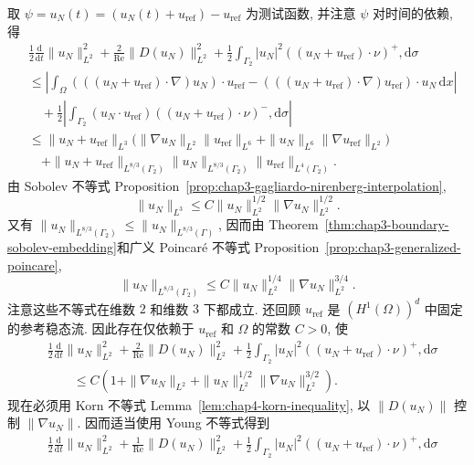 \begin{sloppypar}
\begin{Proof}
取 $\psi=u_N(t)=(u_N(t)+u_{\mathrm{ref}})-u_{\mathrm{ref}}$ 为测试函数, 并注意 $\psi$ 对时间的依赖, 得
\[
\begin{aligned}
 &\frac12\frac{\mathrm d}{\mathrm dt}\|u_N\|_{L^2}^2
 +\frac2{\operatorname{Re}}\|D(u_N)\|_{L^2}^2
 +\frac12\int_{\Gamma_2}|u_N|^2
 ((u_N+u_{\mathrm{ref}})\cdot\nu)^+,\mathrm d\sigma\\
 &\leq\left|\int_\Omega
 (((u_N+u_{\mathrm{ref}})\cdot\nabla)u_N)\cdot u_{\mathrm{ref}}
 -(((u_N+u_{\mathrm{ref}})\cdot\nabla)u_{\mathrm{ref}})\cdot u_N
 \,\mathrm dx\right|\\
 &\quad+\frac12\left|\int_{\Gamma_2}(u_N\cdot u_{\mathrm{ref}})
 ((u_N+u_{\mathrm{ref}})\cdot\nu)^-,\mathrm d\sigma\right|\\
 &\leq\|u_N+u_{\mathrm{ref}}\|_{L^3}
 \bigl(\|\nabla u_N\|_{L^2}\|u_{\mathrm{ref}}\|_{L^6}
 +\|u_N\|_{L^6}\|\nabla u_{\mathrm{ref}}\|_{L^2}\bigr)\\
 &\quad+\|u_N+u_{\mathrm{ref}}\|_{L^{8/3}(\Gamma_2)}
 \|u_N\|_{L^{8/3}(\Gamma_2)}
 \|u_{\mathrm{ref}}\|_{L^4(\Gamma_2)}.
\end{aligned}
\]
由 Sobolev 不等式 Proposition~\ref{prop:chap3-gagliardo-nirenberg-interpolation},
\[
 \|u_N\|_{L^3}\leq C\|u_N\|_{L^2}^{1/2}
 \|\nabla u_N\|_{L^2}^{1/2}.
\]
又有 $\|u_N\|_{L^{8/3}(\Gamma_2)}\leq\|u_N\|_{L^{8/3}(\Gamma)}$, 因而由 Theorem~\ref{thm:chap3-boundary-sobolev-embedding}和广义 Poincaré 不等式 Proposition~\ref{prop:chap3-generalized-poincare},
\[
 \|u_N\|_{L^{8/3}(\Gamma_2)}
 \leq C\|u_N\|_{L^2}^{1/4}\|\nabla u_N\|_{L^2}^{3/4}.
\]
注意这些不等式在维数 $2$ 和维数 $3$ 下都成立. 还回顾 $u_{\mathrm{ref}}$ 是 $(H^1(\Omega))^d$ 中固定的参考稳态流. 因此存在仅依赖于 $u_{\mathrm{ref}}$ 和 $\Omega$ 的常数 $C>0$, 使
\[
\begin{aligned}
 &\frac12\frac{\mathrm d}{\mathrm dt}\|u_N\|_{L^2}^2
 +\frac2{\operatorname{Re}}\|D(u_N)\|_{L^2}^2
 +\frac12\int_{\Gamma_2}|u_N|^2
 ((u_N+u_{\mathrm{ref}})\cdot\nu)^+,\mathrm d\sigma\\
 &\qquad\leq C\left(1+\|\nabla u_N\|_{L^2}
 +\|u_N\|_{L^2}^{1/2}\|\nabla u_N\|_{L^2}^{3/2}\right).
\end{aligned}
\]
现在必须用 Korn 不等式 Lemma~\ref{lem:chap4-korn-inequality}, 以 $\|D(u_N)\|$ 控制 $\|\nabla u_N\|$. 因而适当使用 Young 不等式得到
\[
\begin{aligned}
 &\frac12\frac{\mathrm d}{\mathrm dt}\|u_N\|_{L^2}^2
 +\frac1{\operatorname{Re}}\|D(u_N)\|_{L^2}^2
 +\frac12\int_{\Gamma_2}|u_N|^2
 ((u_N+u_{\mathrm{ref}})\cdot\nu)^+,\mathrm d\sigma\\

\end{aligned}\]
\end{Proof}
\end{sloppypar}
